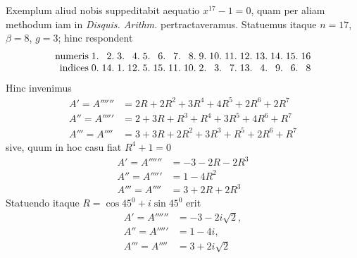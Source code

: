 Exemplum aliud nobis suppeditabit aequatio $x^{17}-1=0$, quam per aliam methodum iam in \emph{Disquis. Arithm.} pertractaveramus. Statuemus itaque $n=17$, $\beta=8$, $g=3$; hinc respondent
%
\[
\begin{array}{r*{16}{@{\;}r}}
\text{numeris}&1\pdot&2\pdot&3\pdot&4\pdot&5\pdot&6\pdot&7\pdot&8\pdot&9\pdot&10\pdot&11\pdot&12\pdot&13\pdot&14\pdot&15\pdot&16\\
\text{indices}&0\pdot&14\pdot&1\pdot&12\pdot&5\pdot&15\pdot&11\pdot&10\pdot&2\pdot&3\pdot&7\pdot&13\pdot&4\pdot&9\pdot&6\pdot&8
\end{array}
\]
Hinc invenimus
\[
\begin{aligned}
A'=A''''''&=2R+2R^2+3R^4+4R^5+2R^6+2R^7\\
A''=A'''''&=2+3R+R^3+R^4+3R^5+4R^6+R^7\\
A'''=A''''&=3+3R+2R^2+3R^3+R^5+2R^6+R^7
\end{aligned}
\]
sive, quum in hoc casu fiat $R^4+1=0$
\[
\begin{aligned}
A'=A''''''&=-3-2R-2R^3\\
A''=A'''''&=1-4R^2\\
A'''=A''''&=3+2R+2R^3
\end{aligned}
\]
Statuendo itaque $R=\cos45^0+i\sin45^0$ erit
\[
\begin{aligned}
A'=A''''''&=-3-2i\surd2,\\
A''=A'''''&=1-4i,\\
A'''=A''''&=3+2i\surd2
\end{aligned}
\]

